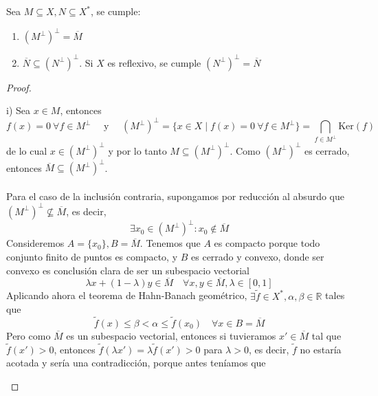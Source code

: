 \begin{prop}
    Sea $M\subseteq X, N \subseteq X^*$, se cumple:
    \begin{enumerate}
        \item[i)] $(M^{\perp})^{\perp} = \overline{M}$
        \item[ii)] $\overline{N} \subseteq (N^{\perp})^{\perp}$. Si $X$ es reflexivo, se cumple $(N^{\perp})^{\perp} = \overline{N}$
    \end{enumerate}

\begin{proof}
    \begin{description}
        \item i) Sea $x\in M$, entonces 
        $$f(x) = 0 \ \forall f \in M^\perp \quad \text{ y } \quad (M^\perp)^\perp = \{ x \in X \mid f(x) = 0 \ \forall f \in M^\perp \}= \bigcap_{f \in M^{\perp}} \text{Ker}(f)$$
        de lo cual $x \in (M^\perp)^\perp$ y por lo tanto $M \subseteq (M^\perp)^\perp$. Como $(M^\perp)^\perp$ es cerrado, entonces $\overline{M} \subseteq (M^\perp)^\perp$. \\ \\
        \noindent
        Para el caso de la inclusión contraria, supongamos por reducción al absurdo que $(M^\perp)^\perp \not\subseteq \overline{M}$, es decir, 
        $$\exists x_0 \in (M^\perp)^\perp : x_0 \notin \overline{M}$$
        Consideremos $A = \{x_0\}, B = \overline{M}$. Tenemos que $A$ es compacto porque todo conjunto finito de puntos es compacto, y $B$ es cerrado y convexo, donde ser convexo es conclusión clara de ser un subespacio vectorial
        \begin{equation*}
            \lambda x + (1 - \lambda) y \in \overline{M} \quad \forall x, y \in \overline{M}, \lambda \in [0, 1]
        \end{equation*}
        Aplicando ahora el teorema de Hahn-Banach geométrico, $\exists \tilde{f} \in X^*, \alpha, \beta \in \mathbb{R}$ tales que
        \begin{equation*}
            \tilde{f}(x) \leq \beta < \alpha \leq \tilde{f}(x_0) \quad \forall x \in B=\overline{M}
        \end{equation*}
        Pero como $\overline{M}$ es un subespacio vectorial, entonces si tuvieramos $x'\in \overline{M}$ tal que $\tilde{f}(x')>0$, entonces $\tilde{f}(\lambda x') = \lambda \tilde{f}(x') > 0$ para $\lambda > 0$, es decir, $\tilde{f}$ no estaría acotada y sería una contradicción, porque antes teníamos que
        \begin{equation*}

\end{equation*}
\end{description}
\end{proof}
\end{prop}
